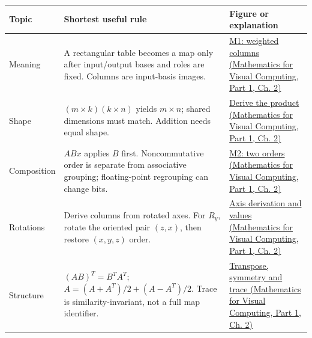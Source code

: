 {\def\LTcaptype{none} %
\begin{longtable}[]{@{}
  >{\raggedright\arraybackslash}p{}
  >{\raggedright\arraybackslash}p{}
  >{\raggedright\arraybackslash}p{}@{}}
\toprule\noalign{}
\begin{minipage}[b]{\linewidth}\raggedright
Topic
\end{minipage} & \begin{minipage}[b]{\linewidth}\raggedright
Shortest useful rule
\end{minipage} & \begin{minipage}[b]{\linewidth}\raggedright
Figure or explanation
\end{minipage} \\
\midrule\noalign{}
\endhead
\bottomrule\noalign{}
\endlastfoot
Meaning & A rectangular table becomes a map only after input/output bases and roles are fixed. Columns are input-basis images. & \href{../02-Mathematics-for-Visual-Computing-P01/main.pdf\#01-foundations-i-ch018-figure-m1---coordinates-weight-the-new-basis-directions}{M1: weighted columns (Mathematics for Visual Computing, Part 1, Ch. 2)} \\
Shape & \((m\times k)(k\times n)\) yields \(m\times n\); shared dimensions must match. Addition needs equal shape. & \href{../02-Mathematics-for-Visual-Computing-P01/main.pdf\#01-foundations-i-ch018-combining-rules-explains-the-multiplication-law}{Derive the product (Mathematics for Visual Computing, Part 1, Ch. 2)} \\
Composition & \(ABx\) applies \(B\) first. Noncommutative order is separate from associative grouping; floating-point regrouping can change bits. & \href{../02-Mathematics-for-Visual-Computing-P01/main.pdf\#01-foundations-i-ch018-figure-m2---the-same-operations-give-different-results-in-different-orders}{M2: two orders (Mathematics for Visual Computing, Part 1, Ch. 2)} \\
Rotations & Derive columns from rotated axes. For \(R_y\), rotate the oriented pair \((z,x)\), then restore \((x,y,z)\) order. & \href{../02-Mathematics-for-Visual-Computing-P01/main.pdf\#01-foundations-i-ch018-the-oriented-plane-explains-the-y-rotation-signs}{Axis derivation and values (Mathematics for Visual Computing, Part 1, Ch. 2)} \\
Structure & \((AB)^T=B^TA^T\); \(A=(A+A^T)/2+(A-A^T)/2\). Trace is similarity-invariant, not a full map identifier. & \href{../02-Mathematics-for-Visual-Computing-P01/main.pdf\#01-foundations-i-ch018-transpose-lets-us-compare-measurements-and-structure}{Transpose, symmetry and trace (Mathematics for Visual Computing, Part 1, Ch. 2)} \\

\end{longtable}}
